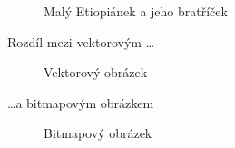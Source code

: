 \documentclass[11pt]{article}
\begin{document}
        \begin{figure}[h]
            \centering
            \caption{Malý Etiopiánek a jeho bratříček}
            \label{img1}
        \end{figure}
        
    \newpage
    
    Rozdíl mezi vektorovým \dots
    \begin{figure}[h]
        \centering
        \caption{Vektorový obrázek}
        \label{img2}
    \end{figure}
    
    \dots a bitmapovým obrázkem
    
    \begin{figure}[h]
        \centering
        \caption{Bitmapový obrázek}
        \label{img3}
    \end{figure}
    
    \noindent
    
\end{document}
